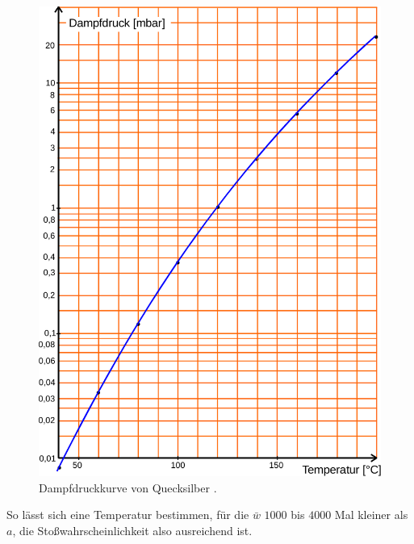 \begin{figure}
    \centering
    \includegraphics[scale=0.5]{figures/Abb_4.pdf}
    \caption{Dampfdruckkurve von Quecksilber \cite{ap08}.}
    \label{fig:abb4}
\end{figure}

So lässt sich eine Temperatur bestimmen, für die $\bar{w}$  $1000$ bis $4000$ Mal kleiner als $a$, die
Stoßwahrscheinlichkeit also ausreichend ist.

